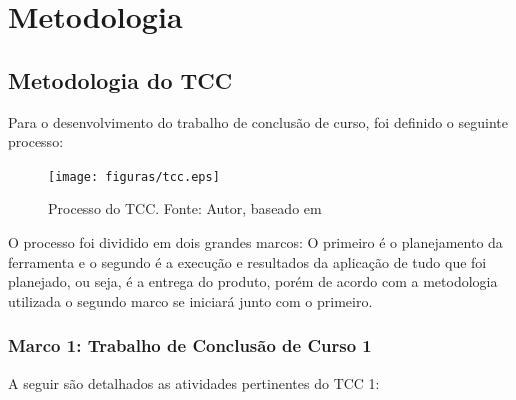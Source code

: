 \chapter{Metodologia}

\section{Metodologia do TCC}

Para o desenvolvimento do trabalho de conclusão de curso, foi definido o seguinte processo:

\begin{figure}[h!]
	\centering
  \texttt{[image: figuras/tcc.eps]}
  \caption[Processo do TCC.]{Processo do TCC. Fonte: Autor, baseado em \cite{leonardo}}
	\label{fig:tcc}
\end{figure}

O processo foi dividido em dois grandes marcos: O primeiro é o planejamento da ferramenta e o segundo é a execução e resultados da aplicação de tudo que foi planejado, ou seja, é a entrega do produto, porém de acordo com a metodologia utilizada o segundo marco se iniciará junto com o primeiro.

\subsection{Marco 1: Trabalho de Conclusão de Curso 1}

A seguir são detalhados as atividades pertinentes do TCC 1:

